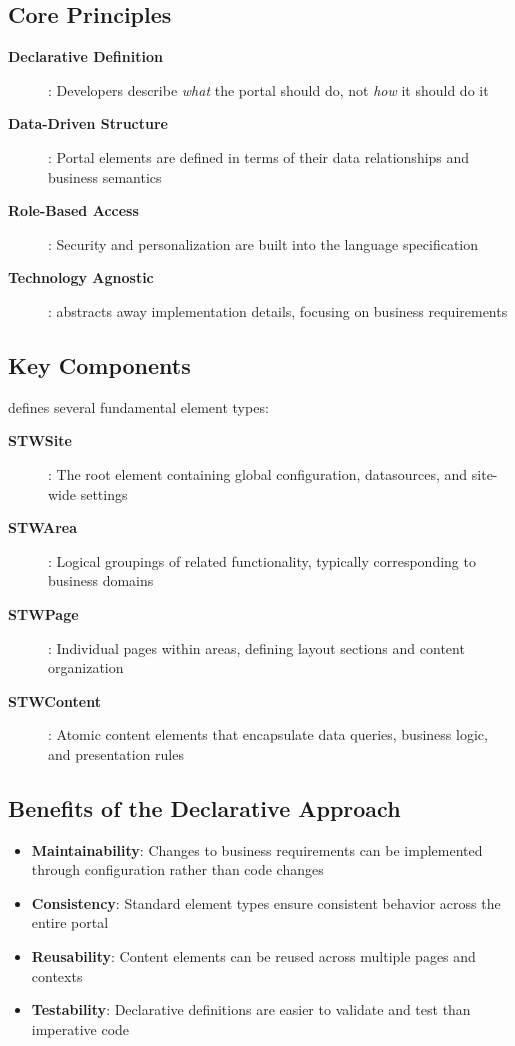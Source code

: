 \subsection{Core Principles}

\begin{description}
\item[\textbf{Declarative Definition}]: Developers describe \textit{what} the portal should do, not \textit{how} it should do it
\item[\textbf{Data-Driven Structure}]: Portal elements are defined in terms of their data relationships and business semantics
\item[\textbf{Role-Based Access}]: Security and personalization are built into the language specification
\item[\textbf{Technology Agnostic}]: \wbdl{} abstracts away implementation details, focusing on business requirements
\end{description}

\subsection{Key Components}

\wbdl{} defines several fundamental element types:

\begin{description}
\item[\textbf{STWSite}]: The root element containing global configuration, datasources, and site-wide settings
\item[\textbf{STWArea}]: Logical groupings of related functionality, typically corresponding to business domains
\item[\textbf{STWPage}]: Individual pages within areas, defining layout sections and content organization
\item[\textbf{STWContent}]: Atomic content elements that encapsulate data queries, business logic, and presentation rules
\end{description}

\subsection{Benefits of the Declarative Approach}

\begin{itemize}
	\item \textbf{Maintainability}: Changes to business requirements can be implemented through configuration rather than code changes
	\item \textbf{Consistency}: Standard element types ensure consistent behavior across the entire portal
	\item \textbf{Reusability}: Content elements can be reused across multiple pages and contexts
	\item \textbf{Testability}: Declarative definitions are easier to validate and test than imperative code
\end{itemize}

